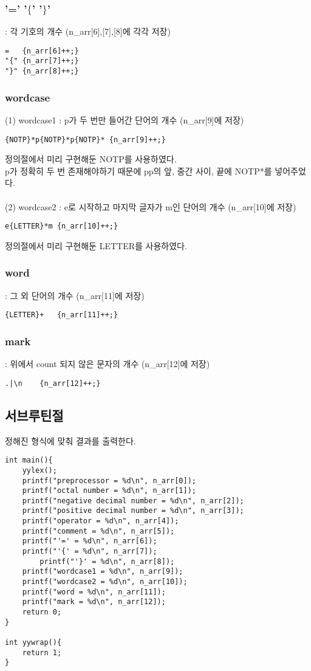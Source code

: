 \documentclass{article}
\begin{document}
	\subsubsection{'=' '$\{$' '$\}$'} 
	: 각 기호의 개수 (n\_arr[6],[7],[8]에 각각 저장)
	\begin{lstlisting}
=	{n_arr[6]++;}
"{"	{n_arr[7]++;}
"}"	{n_arr[8]++;}
	\end{lstlisting}

	\subsubsection{wordcase}
	(1) wordcase1 : p가 두 번만 들어간 단어의 개수 (n\_arr[9]에 저장) 
	 \begin{lstlisting}
{NOTP}*p{NOTP}*p{NOTP}*	{n_arr[9]++;}
	\end{lstlisting}
	정의절에서 미리 구현해둔 NOTP를 사용하였다.\\
	p가 정확히 두 번 존재해야하기 때문에 pp의 앞, 중간 사이, 끝에 {NOTP}*를 넣어주었다. 
	\\
	\\
	(2) wordcase2 : e로 시작하고 마지막 글자가 m인 단어의 개수 (n\_arr[10]에 저장) 
	\begin{lstlisting}
e{LETTER}*m	{n_arr[10]++;}
	\end{lstlisting}
	정의절에서 미리 구현해둔 LETTER를 사용하였다.
	\\
	\subsubsection{word}
	: 그 외 단어의 개수 (n\_arr[11]에 저장) 
	\begin{lstlisting}
{LETTER}+	{n_arr[11]++;}
	\end{lstlisting}
	
	\subsubsection{mark}
	: 위에서 count 되지 않은 문자의 개수 (n\_arr[12]에 저장) 
	\begin{lstlisting}
.|\n	{n_arr[12]++;}	
	\end{lstlisting}	

	\subsection{서브루틴절}
 	정해진 형식에 맞춰 결과를 출력한다.
	\begin{lstlisting}
int main(){
	yylex();
	printf("preprocessor = %d\n", n_arr[0]);
	printf("octal number = %d\n", n_arr[1]);
	printf("negative decimal number = %d\n", n_arr[2]);
	printf("positive decimal number = %d\n", n_arr[3]);
	printf("operator = %d\n", n_arr[4]);
	printf("comment = %d\n", n_arr[5]);
	printf("'=' = %d\n", n_arr[6]);
	printf("'{' = %d\n", n_arr[7]);
		printf("'}' = %d\n", n_arr[8]);
	printf("wordcase1 = %d\n", n_arr[9]);
	printf("wordcase2 = %d\n", n_arr[10]);
	printf("word = %d\n", n_arr[11]);
	printf("mark = %d\n", n_arr[12]);
	return 0;
}

int yywrap(){
	return 1;
}
	\end{lstlisting}
	
\end{document}
